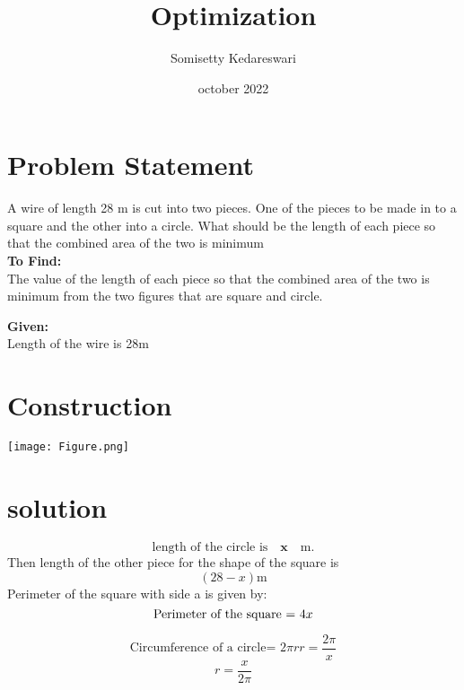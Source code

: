 \documentclass[journal,12pt,twocolumn]{IEEEtran}
\title{Optimization}
\author{Somisetty Kedareswari}
\date{october 2022}
\let\vec\mathbf
\begin{document}
\maketitle
\section{Problem Statement}

\noindent A wire of length 28 m is cut into two pieces. One of the pieces to be made in to a square and the other into a circle. What should be the length of each piece so that the combined area of the two is minimum \\

\noindent \textbf{To Find:} \\
The value of the length of each piece so that the combined area of the two is minimum from the two figures that are square and circle.

\noindent \textbf{Given:} \\
Length of the wire is 28m
\section{Construction}
   \begin{center}
  \texttt{[image: Figure.png]}
    \end{center}
\section{solution}
\begin{equation}
\text{length of the circle is} \quad \vec{x} \quad \text{m} .
\end{equation} 
Then length of the other piece for the shape of the square is \begin{equation}
(28-x) \text{m}
\end{equation} 
Perimeter of the square with side a is given by: \\
\begin{equation}
\text{Perimeter of the square = } 4x \\
\label{eq-1}
\end{equation}

\begin{equation}
\text{Circumference of a circle= }2\pi r 
r=\frac{2\pi}{x}
\label{eq-2}
\end{equation}
\begin{equation}
r=\frac{x}{2\pi}
\label{eq-2}
\end{equation}
\end{document}
